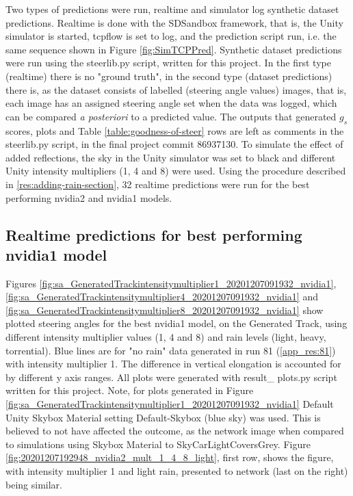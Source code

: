 Two types of predictions were run, realtime and simulator log synthetic dataset predictions. Realtime is done with the SDSandbox framework, that is, the Unity simulator is started, tcpflow is set to log, and the prediction script run, i.e. the same sequence shown in Figure \ref{fig:SimTCPPred}. Synthetic dataset predictions were run using the steerlib.py script, written for this project. 
In the first type (realtime) there is no "ground truth", in the second type (dataset predictions) there is, as the dataset consists of labelled (steering angle values) images, that is, each image has an assigned steering angle set when the data was logged, which can be compared \textit{a posteriori} to a predicted value.
The outputs that generated $g_s$ scores, plots and Table \ref{table:goodness-of-steer} rows are left as comments in the steerlib.py script, in the final project commit 86937130. To simulate the effect of added reflections, the sky in the Unity simulator was set to black and different Unity intensity multipliers (1, 4 and 8) were used.  
Using the procedure described in \ref{res:adding-rain-section}, 32 realtime predictions were run for the best performing nvidia2 and nvidia1 models.


\subsection{Realtime predictions for best performing nvidia1 model}
 Figures
\ref{fig:sa_GeneratedTrackintensitymultiplier1_20201207091932_nvidia1}, \ref{fig:sa_GeneratedTrackintensitymultiplier4_20201207091932_nvidia1} and
\ref{fig:sa_GeneratedTrackintensitymultiplier8_20201207091932_nvidia1} show plotted steering angles for the best nvidia1 model, on the Generated Track, using different intensity multiplier values (1, 4 and 8) and rain levels (light, heavy, torrential). Blue lines are for "no rain" data generated in run 81 (\ref{app_res:81}) with intensity multiplier 1. The difference in vertical elongation is accounted for by different y axis ranges. All plots were generated with result\_ plots.py script written for this project. Note, for plots generated in Figure \ref{fig:sa_GeneratedTrackintensitymultiplier1_20201207091932_nvidia1}
Default Unity Skybox Material setting Default-Skybox (blue sky) was used. This is believed to not have affected the outcome, as the network image when compared to simulations using Skybox Material to SkyCarLightCoversGrey. Figure \ref{fig:20201207192948_nvidia2_mult_1_4_8_light}, first row,
shows the figure, with intensity multiplier 1 and light rain, presented to network (last on the right) being similar.

